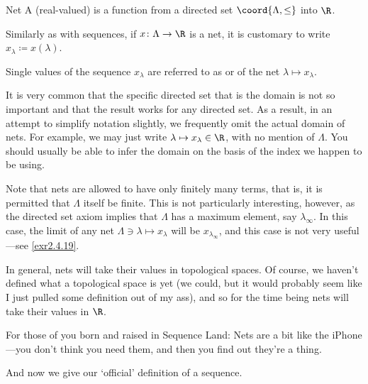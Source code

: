 \begin{dfn}{Net}{}
A (real-valued)  is a function from a directed set $\coord{\Lambda ,\leq}$ into $\R$.
\begin{rmk}
Similarly as with sequences, if $x\colon \Lambda \rightarrow \R$ is a net, it is customary to write $x_\lambda \coloneqq x(\lambda )$.
\end{rmk}
\begin{rmk}
Single values of the sequence $x_{\lambda}$ are referred to as  or  of the net $\lambda \mapsto x_{\lambda}$.
\end{rmk}
\begin{rmk}
It is very common that the specific directed set that is the domain is not so important and that the result works for any directed set.  As a result, in an attempt to simplify notation slightly, we frequently omit the actual domain of nets.  For example, we may just write $\lambda \mapsto x_{\lambda}\in \R$, with no mention of $\Lambda$.  You should usually be able to infer the domain on the basis of the index we happen to be using.
\end{rmk}
\begin{rmk}
Note that nets are allowed to have only finitely many terms, that is, it is permitted that $\Lambda$ itself be finite.  This is not particularly interesting, however, as the directed set axiom implies that $\Lambda$ has a maximum element, say $\lambda_{\infty}$.  In this case, the limit of any net $\Lambda \ni \lambda \mapsto x_{\lambda}$ will be $x_{\lambda _{\infty}}$, and this case is not very useful---see \cref{exr2.4.19}.
\end{rmk}
\begin{rmk}
In general, nets will take their values in topological spaces.  Of course, we haven't defined what a topological space is yet (we could, but it would probably seem like I just pulled some definition out of my ass), and so for the time being nets will take their values in $\R$.
\end{rmk}
\begin{rmk}
For those of you born and raised in Sequence Land:  Nets are a bit like the iPhone---you don't think you need them, and then you find out they're a thing.
\end{rmk}
\end{dfn}
And now we give our `official' definition of a sequence.
